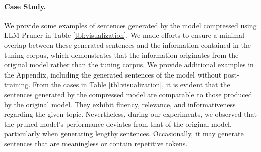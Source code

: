 \documentclass{article}
\begin{document}
\begin{table}[h]
    \centering
    \caption{Scratch Training (StableLM-3B) vs. LLaMA-3B (by LLM-Pruner)} \label{tbl:llama_stableLM}
    \vspace{-3mm}
\end{table}

\paragraph{Case Study.} We provide some examples of sentences generated by the model compressed using LLM-Pruner in Table \ref{tbl:visualization}. We made efforts to ensure a minimal overlap between these generated sentences and the information contained in the tuning corpus, which demonstrates that the information originates from the original model rather than the tuning corpus. We provide additional examples in the Appendix, including the generated sentences of the model without post-training. From the cases in Table \ref{tbl:visualization}, it is evident that the sentences generated by the compressed model are comparable to those produced by the original model. They exhibit fluency, relevance, and informativeness regarding the given topic. Nevertheless, during our experiments, we observed that the pruned model's performance deviates from that of the original model, particularly when generating lengthy sentences. Occasionally, it may generate sentences that are meaningless or contain repetitive tokens.

\end{document}
